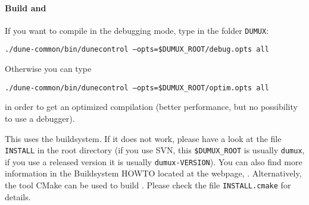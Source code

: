 % 
% 
% 
% 
% 
% 

\paragraph{Build \Dune and \Dumux}
\label{buildIt}
If you want to compile in the debugging mode, type in the folder \texttt{DUMUX}: 
\begin{center}
\texttt{./dune-common/bin/dunecontrol --opts=\$DUMUX\_ROOT/debug.opts all}
\end{center}

Otherwise you can type
\begin{center}
\texttt{./dune-common/bin/dunecontrol --opts=\$DUMUX\_ROOT/optim.opts all}
\end{center}
in order to get an optimized compilation (better performance, but no possibility to use a debugger).

This uses the \Dune buildsystem. If it does not work, please have a look at the file \texttt{INSTALL} in the \Dumux root directory (if you use SVN, this \texttt{\$DUMUX\_ROOT} is usually \texttt{dumux}, if you use a released version it is usually \texttt{dumux-VERSION}). You can also find more information in the \Dune Buildsystem HOWTO located at the \Dune webpage, \cite{DUNE-HP}.  Alternatively, the tool CMake can be used to build \Dumux. Please check the file \texttt{INSTALL.cmake} for details.

